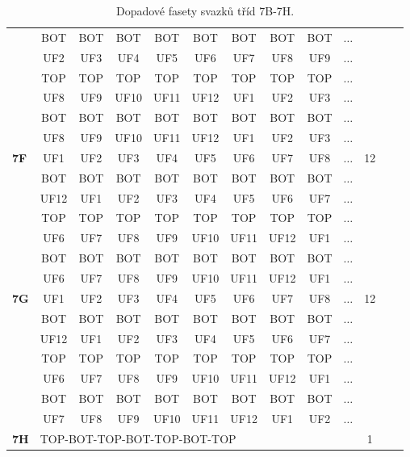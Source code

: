 \begin{table}[h!]
\begin{tabular}{|l|c|c|c|c|c|c|c|c|c|c|c|c|}
 & BOT & BOT & BOT & BOT & BOT & BOT & BOT & BOT & $\dots$ & \\
 & UF2 & UF3 & UF4 & UF5 & UF6 & UF7 & UF8 & UF9 & $\dots$ & \\
 & TOP & TOP & TOP & TOP & TOP & TOP & TOP & TOP & $\dots$ & \\
 & UF8 & UF9 & UF10 & UF11 & UF12 & UF1 & UF2 & UF3 & $\dots$ & \\
 & BOT & BOT & BOT & BOT & BOT & BOT & BOT & BOT & $\dots$ & \\
 & UF8 & UF9 & UF10 & UF11 & UF12 & UF1 & UF2 & UF3 & $\dots$ & \\
\hline \hline
\textbf{7F} & UF1 & UF2 & UF3 & UF4 & UF5 & UF6 & UF7 & UF8 & $\dots$ & 12\\
 & BOT & BOT & BOT & BOT & BOT & BOT & BOT & BOT & $\dots$ & \\
 & UF12 & UF1 & UF2 & UF3 & UF4 & UF5 & UF6 & UF7 & $\dots$ & \\
 & TOP & TOP & TOP & TOP & TOP & TOP & TOP & TOP & $\dots$ & \\
 & UF6 & UF7 & UF8 & UF9 & UF10 & UF11 & UF12 & UF1 & $\dots$ & \\
 & BOT & BOT & BOT & BOT & BOT & BOT & BOT & BOT & $\dots$ & \\
 & UF6 & UF7 & UF8 & UF9 & UF10 & UF11 & UF12 & UF1 & $\dots$ & \\
\hline \hline
\textbf{7G} & UF1 & UF2 & UF3 & UF4 & UF5 & UF6 & UF7 & UF8 & $\dots$ & 12\\
 & BOT & BOT & BOT & BOT & BOT & BOT & BOT & BOT & $\dots$ & \\
 & UF12 & UF1 & UF2 & UF3 & UF4 & UF5 & UF6 & UF7 & $\dots$ & \\
 & TOP & TOP & TOP & TOP & TOP & TOP & TOP & TOP & $\dots$ & \\
 & UF6 & UF7 & UF8 & UF9 & UF10 & UF11 & UF12 & UF1 & $\dots$ & \\
 & BOT & BOT & BOT & BOT & BOT & BOT & BOT & BOT & $\dots$ & \\
 & UF7 & UF8 & UF9 & UF10 & UF11 & UF12 & UF1 & UF2 & $\dots$ & \\
\hline \hline
\textbf{7H} & \multicolumn{9}{l}{TOP-BOT-TOP-BOT-TOP-BOT-TOP} \vline  & 1\\
\hline 
\end{tabular}
\caption{Dopadové fasety svazků tříd 7B-7H.}
\label{table:TableClasses3}
\end{table}



